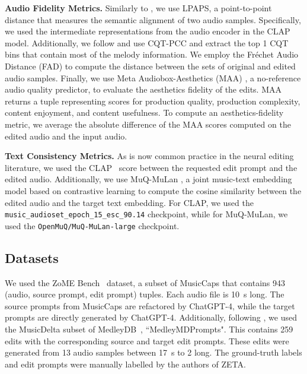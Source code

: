 \noindent \textbf{Audio Fidelity Metrics.} Similarly to \cite{paissan2024b_inspeech}, we use LPAPS, a point-to-point distance that measures the semantic alignment of two audio samples. Specifically, we used the intermediate representations from the audio encoder in the CLAP model. Additionally, we follow \cite{hou2025editing,steermusic} and use CQT-PCC and extract the top 1 CQT bins that contain most of the melody information. We employ the Fr\'echet Audio Distance (FAD) to compute the distance between the sets of original and edited audio samples. Finally, we use Meta Audiobox-Aesthetics (MAA) \cite{tjandra2025meta}, a no-reference audio quality predictor, to evaluate the aesthetics fidelity of the edits. MAA returns a tuple representing scores for production quality, production complexity, content enjoyment, and content usefulness. To compute an aesthetics-fidelity metric, we average the absolute difference of the MAA scores computed on the edited audio and the input audio.

\noindent \textbf{Text Consistency Metrics.} As is now common practice in the neural editing literature, we used the CLAP~\cite{wu2024largescalecontrastivelanguageaudiopretraining} score between the requested edit prompt and the edited audio. Additionally, we use MuQ-MuLan \cite{zhu2025muq}, a joint music-text embedding model based on contrastive learning to compute the cosine similarity between the edited audio and the target text embedding. For CLAP, we used the \texttt{music\_audioset\_epoch\_15\_esc\_90.14} checkpoint, while for MuQ-MuLan, we used the \texttt{OpenMuQ/MuQ-MuLan-large} checkpoint.

\subsection{Datasets}
We used the ZoME Bench~\cite{liu2024mediczeroshotmusicediting} dataset, a subset of MusicCaps that contains 943 (audio, source prompt, edit prompt) tuples. Each audio file is \SI{10}{\s} long. The source prompts from MusicCaps are refactored by ChatGPT-4, while the target prompts are directly generated by ChatGPT-4. Additionally, following \cite{Manor2024ZeroShotUA}, we used the MusicDelta subset of MedleyDB~\cite{bittner2016medleydb}, ``MedleyMDPrompts". This contains 259 edits with the corresponding source and target edit prompts. These edits were generated from 13 audio samples between \SI{17}{\s} to \SI{2}{\min} long. The ground-truth labels and edit prompts were manually labelled by the authors of ZETA. 

